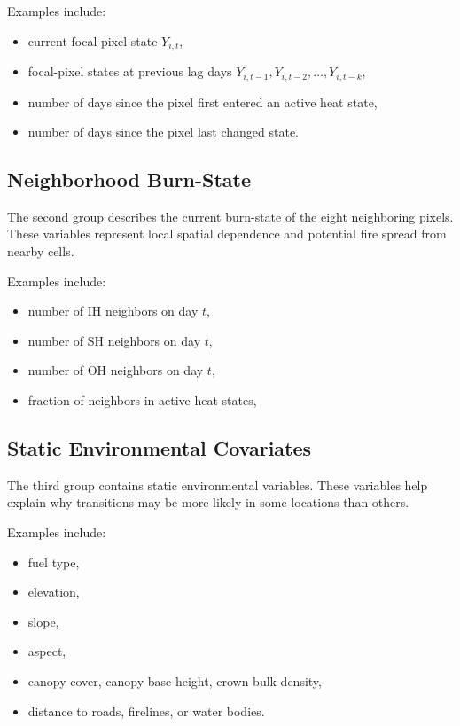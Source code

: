 \documentclass[11pt]{article}
\begin{document}
Examples include:

\begin{itemize}
    \item current focal-pixel state $Y_{i,t}$,
    \item focal-pixel states at previous lag days $Y_{i,t-1}, Y_{i,t-2}, \ldots, Y_{i,t-k}$,
    \item number of days since the pixel first entered an active heat state,
    \item number of days since the pixel last changed state.
\end{itemize}

\subsection*{Neighborhood Burn-State}

The second group describes the current burn-state of the eight neighboring pixels. These variables represent local spatial dependence and potential fire spread from nearby cells.

Examples include:

\begin{itemize}
    \item number of IH neighbors on day $t$,
    \item number of SH neighbors on day $t$,
    \item number of OH neighbors on day $t$,
    \item fraction of neighbors in active heat states,
\end{itemize}

\subsection*{Static Environmental Covariates}

The third group contains static environmental variables. These variables help explain why transitions may be more likely in some locations than others.

Examples include:

\begin{itemize}
    \item fuel type,
    \item elevation,
    \item slope,
    \item aspect,
    \item canopy cover, canopy base height, crown bulk density,
    \item distance to roads, firelines, or water bodies.
\end{itemize}
\end{document}
